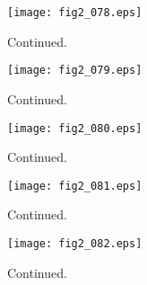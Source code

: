\documentclass[preprint]{aastex}
\begin{document}
\setcounter{figure}{1}
\begin{figure}[t]
\centering
\texttt{[image: fig2\_078.eps]}
\caption{
Continued. 
}
\label{Fig2}
\end{figure}
\clearpage



\setcounter{figure}{1}
\begin{figure}[t]
\centering
\texttt{[image: fig2\_079.eps]}
\caption{
Continued. 
}
\label{Fig2}
\end{figure}
\clearpage



\setcounter{figure}{1}
\begin{figure}[t]
\centering
\texttt{[image: fig2\_080.eps]}
\caption{
Continued. 
}
\label{Fig2}
\end{figure}
\clearpage



\setcounter{figure}{1}
\begin{figure}[t]
\centering
\texttt{[image: fig2\_081.eps]}
\caption{
Continued. 
}
\label{Fig2}
\end{figure}
\clearpage



\setcounter{figure}{1}
\begin{figure}[t]
\centering
\texttt{[image: fig2\_082.eps]}
\caption{
Continued. 
}
\label{Fig2}
\end{figure}
\clearpage
\end{document}
